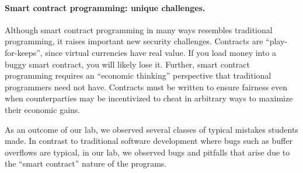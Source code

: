 \documentclass[10pt,twocolumn,letterpaper]{article}
\newcommand{\elaine}[1]{}
\newcommand{\ignore}[1]{}
\begin{document}
\ignore{
The first part of this lab consists of step-by-step examples illustrating basic design of functional smart contracts. We highly recommend you take a hands-on approach, and interact with these smart contract examples using the Ethereum simulator! The accompanying materials to everything you need to get started with experimenting, including  a virtual machine image, basic instructions, and a language guide.

The second part of this lab focuses on designing smart contracts that achieve their intended goals, and are robust to attacks. 
Although our lab makes us of a simulator, the smart contracts you write can also be used in the live Ethereum network\footnote{At the time of this writing, the only live Ethereum network is a test network, since the main network has not yet launched.} The basic concepts we discuss apply to other cryptocurrencies as well (including Bitcoin), so most of what you learn will be transferable.
}

\paragraph{Smart contract programming: unique challenges.}
Although smart contract programming in many ways resembles 
traditional programming, 
it raises important new security challenges. 
Contracts are ``play-for-keeps'', since virtual currencies have real value. 
If you load money into a buggy smart contract, you will likely lose it. 
Further, smart contract programming requires
an ``economic thinking'' perspective that traditional
programmers need not have. 
Contracts must be written to ensure fairness even when
counterparties may be incentivized to cheat in arbitrary ways to maximize
their economic gains.




As an outcome of our lab, we observed several classes
of typical mistakes students made. 
In contrast to  
traditional software development where 
bugs such as buffer overflows are typical, 
in our lab, we observed 
bugs and pitfalls that arise due to 
the ``smart contract'' nature of the programs. 
\end{document}
